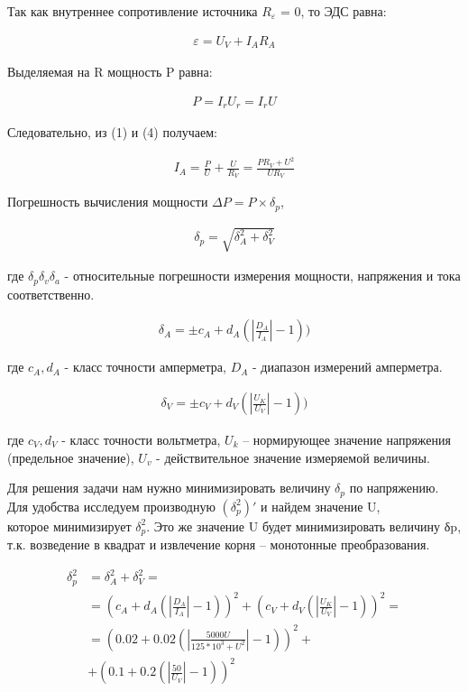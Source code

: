 \documentclass[a4paper,14pt]{extarticle}
\begin{document}
Так как внутреннее сопротивление источника $R_{\varepsilon}$ = 0, то ЭДС равна:

\begin{align}
  \varepsilon = U_V + I_A R_A
\end{align}

Выделяемая на R мощность P равна:

\begin{align}
  P = I_r U_r = I_r U
\end{align}

Следовательно, из (1) и (4) получаем:

\begin{align}
  I_A = \frac{P}{U} + \frac{U}{R_V} = \frac{P R_V + U^2}{U R_V}
\end{align}

Погрешность вычисления мощности $\Delta P = P \times \delta_p$,

\begin{align}
  \delta_p = \sqrt{\delta_A^2 + \delta_V^2}
\end{align}

где $\delta_p \delta_v \delta_a$ - относительные погрешности измерения мощности, напряжения и тока соответственно.

\begin{align}
  \delta_A = \pm c_A + d_A (|\frac{D_A}{I_A}| - 1))
\end{align}

где $c_A, d_A$ - класс точности амперметра, $D_A$ - диапазон измерений амперметра.

\begin{align}
  \delta_V = \pm c_V + d_V (|\frac{U_K}{U_V}| - 1))
\end{align}

где $c_V, d_V$ - класс точности вольтметра, $U_k$ – нормирующее значение напряжения (предельное значение),  $U_v$ - действительное значение измеряемой величины.

Для решения задачи нам нужно минимизировать величину $\delta_p$ по напряжению.
Для удобства исследуем производную $(\delta_p^2)'$ и найдем значение U,\\
которое минимизирует $\delta_p^2$. Это же значение U будет минимизировать величину δp, т.к. возведение в квадрат и извлечение корня – монотонные преобразования.

\begin{align*}
  \delta_p^2 &= \delta_A^2 + \delta_V^2 = \\
  &= (c_A + d_A (|\frac{D_A}{I_A}| - 1))^2 + (c_V + d_V (|\frac{U_K}{U_V}| - 1))^2 = \\
  &= (0.02 + 0.02(|\frac{5000U}{125*10^3 + U^2}| - 1))^2 + \\
  &+ (0.1 + 0.2(|\frac{50}{U_V}| - 1))^2
\end{align*}
\end{document}
